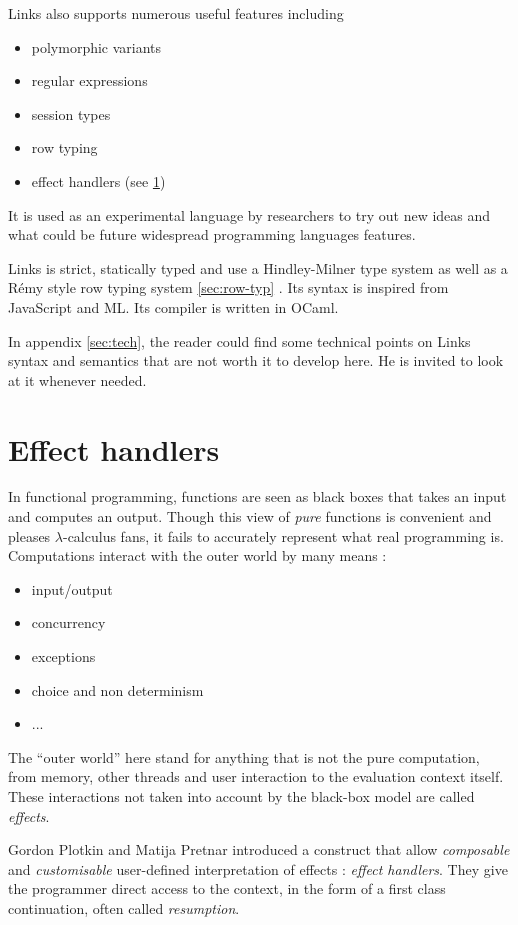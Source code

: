 \documentclass[10pt, nonacm=true, language=french, language=english]{acmart}
\begin{document}
Links also supports numerous useful features including
\begin{itemize}
  \item polymorphic variants
  \item regular expressions
  \item session types
  \item row typing
  \item effect handlers (see \ref{sec:handlers})
\end{itemize}
It is used as an experimental language by researchers to try out new ideas and what could be future widespread programming languages features.

Links is strict, statically typed and use a Hindley-Milner type system as well as a Rémy style row typing system \ref{sec:row-typ} \citep{row-typ}. Its syntax is inspired from JavaScript and ML. Its compiler \citep{gh:links} is written in OCaml.

\begin{rem}
  In appendix \ref{sec:tech}, the reader could find some technical points on Links syntax and semantics that are not worth it to develop here. He is invited to look at it whenever needed.
\end{rem}

\section{Effect handlers}
\label{sec:handlers}

In functional programming, functions are seen as black boxes that takes an input and computes an output. Though this view of \emph{pure} functions is convenient and pleases $\lambda$-calculus fans, it fails to accurately represent what real programming is. Computations interact with the outer world by many means :
\begin{itemize}
  \item input/output
  \item concurrency
  \item exceptions
  \item choice and non determinism
  \item ...
\end{itemize}
The ``outer world'' here stand for anything that is not the pure computation, from memory, other threads and user interaction to the evaluation context itself.
These interactions not taken into account by the black-box model are called \emph{effects}.

Gordon Plotkin and Matija Pretnar \citep{plotkin-pretnar} introduced a construct that allow \emph{composable} and \emph{customisable} user-defined interpretation of effects : \emph{effect handlers}. They give the programmer direct access to the context, in the form of a first class continuation, often called \emph{resumption}.
\end{document}
